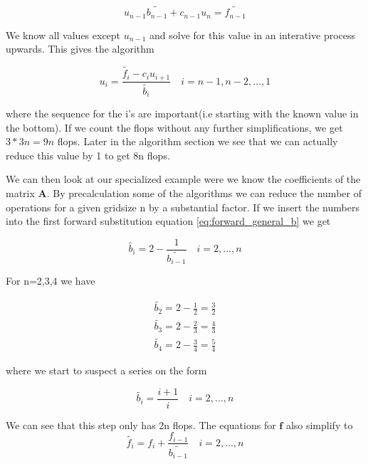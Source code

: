 \documentclass[a4paper,11pt]{article}
\begin{document}
{\begin{equation}
u_{n-1}\tilde{b_{n-1}}+c_{n-1}u_n = \tilde{f_{n-1}}
\end{equation}
		
We know all values except $u_{n-1}$ and solve for this value in an interative process upwards. This gives the algorithm 
		
\begin{equation}
u_i = \frac{\tilde{f_i}-c_i u_{i+1}}{\tilde{b_i}}\quad i = n-1, n-2, ..., 1
\label{eq:forward_general_u}
\end{equation}
	
where the sequence for the i's are important(i.e starting with the known value in the bottom). If we count the flops without any further simplifications, we get $3*3n=9n$ flops. Later in the algorithm section we see that we can actually reduce this value by 1 to get 8n flops. 
		
		
We can then look at our specialized example were we know the coefficients of the matrix $\mathbf{A}$. By precalculation some of the algorithms we can reduce the number of operations for a given gridsize n by a substantial factor. If we insert the numbers into the first forward substitution equation \ref{eq:forward_general_b} we get
		
\begin{equation}
\tilde{b_i}=2-\frac{1}{\tilde{b_{i-1}}}\quad i = 2, ..., n
\end{equation}
		
For n=2,3,4 we have 
		
\begin{align}
\tilde{b_2}=2-\frac{1}{2}=\frac{3}{2} \\
\tilde{b_3}=2-\frac{2}{3}=\frac{4}{3} \\
\tilde{b_4}=2-\frac{3}{4}=\frac{5}{4}
\end{align}
	
where we start to suspect a series on the form
		
\begin{equation}
\tilde{b_i}=\frac{i+1}{i}  \quad i = 2, ..., n
\label{eq:forward_specific_b}
\end{equation}
		
We can see that this step only has 2n flops. The equations for $\mathbf{f}$ also simplify to
\begin{equation}
\tilde{f_i}=f_{i}+\frac{f_{i-1}}{\tilde{b_{i-1}}}\quad i = 2, ..., n
\label{eq:forward_specific_f}
\end{equation}
		
}
\end{document}
